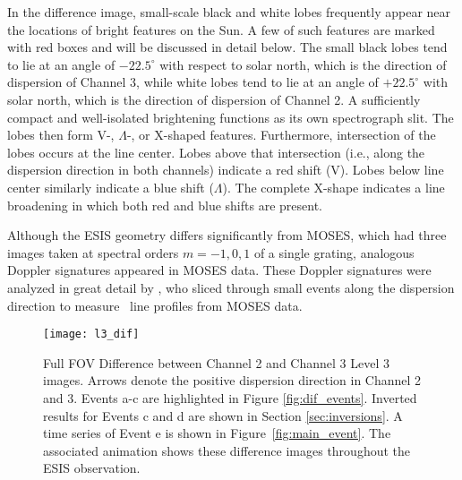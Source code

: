     	
    	In the difference image, small-scale black and white lobes frequently appear near the locations of bright features on the Sun. A few of such features are marked with red boxes and will be discussed in detail below.  
    	The small black lobes tend to lie at an angle of $-22.5^\circ$ with respect to solar north, which is the direction of dispersion of Channel 3, while white lobes tend to lie at an angle of $+22.5^\circ$ with solar north, which is the direction of dispersion of Channel 2. A sufficiently compact and well-isolated brightening functions as its own spectrograph slit. 
    	The lobes then form V-, $\Lambda$-, or X-shaped features. 
    	Furthermore, intersection of the lobes occurs at the line center. 
    	Lobes above that intersection (i.e., along the dispersion direction in both channels) indicate a red shift (V). 
    	Lobes below line center similarly indicate a blue shift ($\Lambda$). The complete X-shape indicates a line broadening in which both red and blue shifts are present.
    	
    	Although the ESIS geometry differs significantly from MOSES, which had three images taken at spectral orders $m=-1, 0, 1$
    	of a single grating, analogous Doppler signatures appeared in MOSES data. These Doppler signatures were analyzed in great detail by \citet{Rust2019}, who sliced through small events along the dispersion direction to measure \heii \ line profiles from MOSES data.
    	    
   		
  		\begin{figure*}
  			\centering
  			\texttt{[image: l3\_dif]}
  			\caption{Full FOV Difference between Channel 2 and Channel 3 Level 3 images.  
  			Arrows denote the positive dispersion direction in Channel 2 and 3.
  			Events a-c are highlighted in Figure \ref{fig:dif_events}.    
  			Inverted results for Events c and d are shown in Section \ref{sec:inversions}. 
  			A time series of Event e is shown in Figure~\ref{fig:main_event}.
  			The associated animation shows these difference images throughout the ESIS observation.}
  			\label{fig:l3_dif}
  		\end{figure*}
   	
